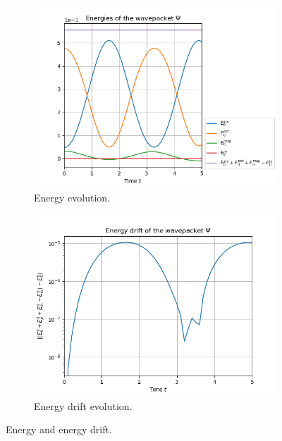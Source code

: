 \documentclass[11pt, a4paper, oneside]{article}
\begin{document}
\begin{figure}[h]
  \begin{subfigure}[b]{0.45 \textwidth}
    \includegraphics[width = \textwidth]{graphics/torsional/energies_block0.PNG}
    \caption{Energy evolution.}
  \end{subfigure}
  \hfill
  \begin{subfigure}[b]{0.45 \textwidth}
    \includegraphics[width = \textwidth]{graphics/torsional/energy_drift_block0_log.PNG}
    \caption{Energy drift evolution.}
  \end{subfigure}
  \caption{Energy and energy drift.}
  \label{fig:cos_energy}
\end{figure}
\end{document}
